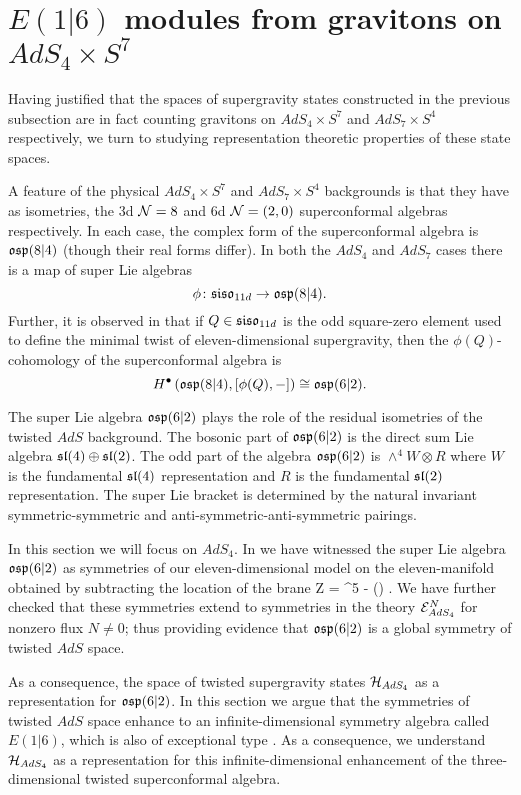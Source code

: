 \documentclass[../main.tex]{subfiles}
\begin{document}
 

\section{$E(1|6)$ modules from gravitons on $AdS_4\times S^7$}\label{sec:e16}

Having justified that the spaces of supergravity states constructed in the previous subsection are in fact counting gravitons on $AdS_4\times S^7$ and $AdS_7\times S^4$ respectively, we turn to studying representation theoretic properties of these state spaces.

A feature of the physical $AdS_4\times S^7$ and $AdS_7\times S^4$ backgrounds is that they have as isometries, the 3d $\mathcal{N}=8$ and 6d $\mathcal{N}=(2,0)$ superconformal algebras respectively.
In each case, the complex form of the superconformal algebra is $\mathfrak{osp}(8|4)$ (though their real forms differ).
In both the $AdS_4$ and $AdS_7$ cases there is a map of super Lie algebras 
\[
\phi \colon \mathfrak{siso}_{11d} \to \mathfrak{osp}(8|4).
\]
Further, it is observed in \cite{SWsuco2} that if $Q\in \mathfrak{siso}_{11d}$ is the odd square-zero element used to define the minimal twist of eleven-dimensional supergravity, then the $\phi(Q)$-cohomology of the superconformal algebra is 
\[ H^\bullet \left ( \mathfrak{osp}(8|4), [\phi(Q), - ]\right )\cong \mathfrak{osp}(6|2).\]

The super Lie algebra $\mathfrak{osp}(6|2)$ plays the role of the residual isometries of the twisted $AdS$ background. 
The bosonic part of $\mathfrak{osp}(6|2)$ is the direct sum Lie algebra $\mathfrak{sl}(4) \oplus \mathfrak{sl}(2)$. The odd part of the algebra $\mathfrak{osp}(6|2)$ is $\wedge^4 W \otimes R$ where $W$ is the fundamental $\mathfrak{sl}(4)$ representation and $R$ is the fundamental $\mathfrak{sl}(2)$ representation.
The super Lie bracket is determined by the natural invariant symmetric-symmetric and anti-symmetric-anti-symmetric pairings.

In this section we will focus on $AdS_4$.
In \cite{RSW} we have witnessed the super Lie algebra $\mathfrak{osp}(6|2)$ as symmetries of our eleven-dimensional model on the eleven-manifold obtained by subtracting the location of the brane
\beqn
\til Z = \R \times \C^5 - (\R \times \C {}) .
\eeqn
We have further checked that these symmetries extend to symmetries in the theory $\mathcal{E}^N_{AdS_4}$ for nonzero flux $N \ne 0$; thus providing evidence that $\mathfrak{osp}(6|2)$ is a global symmetry of twisted $AdS$ space.

As a consequence, the space of twisted supergravity states $\mathcal H_{AdS_4}$ as a representation for $\mathfrak{osp}(6|2)$.
In this section we argue that the symmetries of twisted $AdS$ space enhance to an infinite-dimensional symmetry algebra called $E(1|6)$, which is also of exceptional type \cite{KacClass}.
As a consequence, we understand $\mathcal H_{AdS_4}$ as a representation for this infinite-dimensional enhancement of the three-dimensional twisted superconformal algebra.
\end{document}
